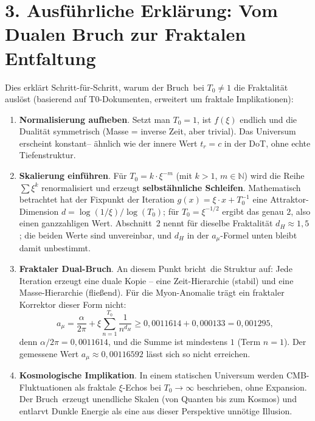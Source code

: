 	\section*{3. Ausführliche Erklärung: Vom Dualen Bruch zur Fraktalen Entfaltung}
	Dies erklärt Schritt-für-Schritt, warum der \glqq Bruch\grqq\ bei \( T_0 \neq 1 \) die Fraktalität auslöst (basierend auf T0-Dokumenten, erweitert um fraktale Implikationen):
	\begin{enumerate}[label=\textbf{Schritt \arabic*:}, leftmargin=*]
		\item \textbf{Normalisierung aufheben}. Setzt man \( T_0 = 1 \), ist \( f(\xi) \) endlich und die Dualität symmetrisch (Masse = inverse Zeit, aber trivial). Das Universum erscheint \glqq konstant\grqq – ähnlich wie der innere Wert \( t_r = c \) in der DoT, ohne echte Tiefenstruktur.
		\item \textbf{Skalierung einführen}. Für \( T_0 = k \cdot \xi^{-m} \) (mit \( k > 1 \), \( m \in \mathbb{N} \)) wird die Reihe \( \sum \xi^k \) renormalisiert und erzeugt \textbf{selbstähnliche Schleifen}. Mathematisch betrachtet hat der Fixpunkt der Iteration \( g(x) = \xi \cdot x + T_0^{-1} \) eine Attraktor-Dimension \( d = \log(1/\xi) / \log(T_0) \); für \( T_0 = \xi^{-1/2} \) ergibt das genau \( 2 \), also einen ganzzahligen Wert. Abschnitt~2 nennt für dieselbe Fraktalität \( d_H \approx 1{,}5 \); die beiden Werte sind unvereinbar, und \( d_H \) in der \( a_\mu \)-Formel unten bleibt damit unbestimmt.
		\item \textbf{Fraktaler Dual-Bruch}. An diesem Punkt \glqq bricht\grqq\ die Struktur auf: Jede Iteration erzeugt eine duale Kopie – eine Zeit-Hierarchie (stabil) und eine Masse-Hierarchie (fließend). Für die Myon-Anomalie trägt ein fraktaler Korrektor dieser Form nicht:
		\[
		a_\mu = \frac{\alpha}{2\pi} + \xi \sum_{n=1}^{T_0} \frac{1}{n^{d_H}} \geq 0{,}0011614 + 0{,}000133 = 0{,}001295,
		\]
		denn \( \alpha/2\pi = 0{,}0011614 \), und die Summe ist mindestens \( 1 \) (Term \( n=1 \)). Der gemessene Wert \( a_\mu \approx 0{,}00116592 \) lässt sich so nicht erreichen.
		\item \textbf{Kosmologische Implikation}. In einem statischen Universum werden CMB-Fluktuationen als fraktale \( \xi \)-Echos bei \( T_0 \to \infty \) beschrieben, ohne Expansion. Der \glqq Bruch\grqq\ erzeugt unendliche Skalen (von Quanten bis zum Kosmos) und entlarvt Dunkle Energie als eine aus dieser Perspektive unnötige Illusion.
	\end{enumerate}
	
